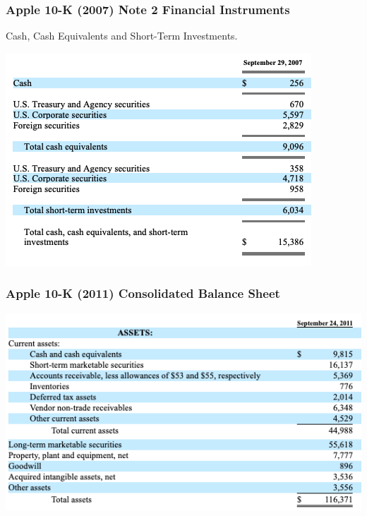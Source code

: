 \documentclass[handout]{beamer}
\begin{document}
\begin{frame}
\frametitle{Apple 10-K (2007) Note 2 Financial Instruments}
 Cash, Cash Equivalents and Short-Term Investments.

\centering
\includegraphics[scale=0.5]{AAPL_2007_note2}

\hyperlink{standardapproach}{}
\end{frame}






\begin{frame}[label=APPL2011]
\frametitle{Apple 10-K (2011) Consolidated Balance Sheet}

\centering
\includegraphics[scale=0.5]{AAPL_2011_bs}
\end{frame}
\end{document}
